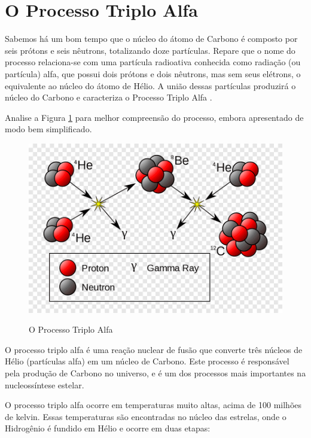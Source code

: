 \documentclass[a4paper,12pt,]{book}
\begin{document}
\section{O Processo Triplo Alfa}
Sabemos há um bom tempo que o núcleo do átomo de Carbono é composto por seis prótons e seis nêutrons, totalizando doze partículas. Repare que o nome do processo relaciona-se com uma partícula radioativa conhecida como radiação (ou partícula) alfa, que possui dois prótons e dois nêutrons, mas sem seus elétrons, o equivalente ao núcleo do átomo de Hélio. A união dessas partículas produzirá o núcleo do Carbono e caracteriza o Processo Triplo Alfa  \cite{TA}.

Analise a Figura \ref{fig:triploalfa} para melhor compreensão do processo, embora apresentado de modo bem simplificado.

\begin{figure}[h]
	\centering
	\caption{O Processo Triplo Alfa}
	\vspace{0.25cm}
	\includegraphics[width=0.75\linewidth]{imagens/ta.png} 
	\label{fig:triploalfa}
\end{figure}

O processo triplo alfa é uma reação nuclear de fusão que converte três núcleos de Hélio (partículas alfa) em um núcleo de Carbono. Este processo é responsável pela produção de Carbono no universo, e é um dos processos mais importantes na nucleossíntese estelar.

O processo triplo alfa ocorre em temperaturas muito altas, acima de 100 milhões de kelvin. Essas temperaturas são encontradas no núcleo das estrelas, onde o Hidrogênio é fundido em Hélio e ocorre em duas etapas:
\end{document}
